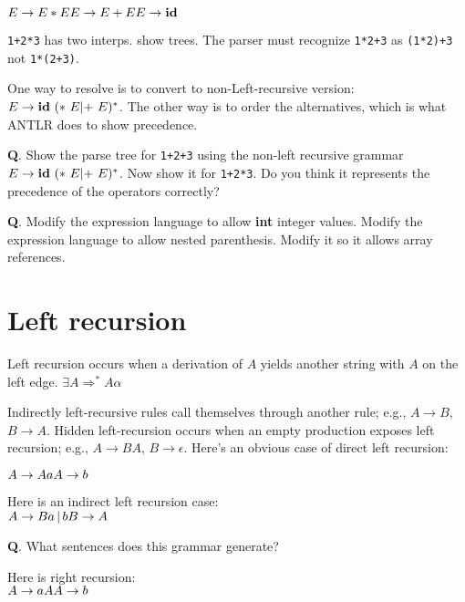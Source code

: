 \documentclass[11pt,twocolumn,nocopyright]{sigplanconf}
\begin{document}
\noindent $
E \rightarrow E * E\\
E \rightarrow E + E\\
E \rightarrow {\bf id}\\
$

{\tt 1+2*3} has two interps. show trees.  The parser must recognize {\tt 1*2+3} as {\tt (1*2)+3} not {\tt 1*(2+3)}.

One way to resolve is to convert to non-Left-recursive version: $E \rightarrow {\bf id}\ (*\ E | {\bf +}\ E)^*$.  The other way is to order the alternatives, which is what ANTLR does to show precedence.

{\bf Q}. Show the parse tree for {\tt 1+2+3} using the non-left recursive grammar $E \rightarrow {\bf id}\ (*\ E | {\bf +}\ E)^*$. Now show it for {\tt 1+2*3}. Do you think it represents the precedence of the operators correctly?

{\bf Q}. Modify the expression language to allow {\bf int} integer values. Modify the expression language to allow nested parenthesis. Modify it so it allows array references.

\section{Left recursion}

Left recursion occurs when a derivation of $A$ yields another string with $A$ on the left edge. $\exists A \Rightarrow^* A\alpha$
 
Indirectly left-recursive rules call themselves through another rule; e.g., $A \rightarrow B$, $B \rightarrow A$. Hidden left-recursion occurs
when an empty production exposes left recursion; e.g., $A \rightarrow
B A$, $B \rightarrow \epsilon$.  Here's an obvious case of direct left recursion:

\noindent $
A \rightarrow A a\\
A \rightarrow b\\
$

\noindent Here is an indirect left recursion case:\\

\noindent $
A \rightarrow Ba\, |\, b\\
B \rightarrow A\\
$

{\bf Q}. What sentences does this grammar generate?

\noindent Here is right recursion:\\

\noindent $
A \rightarrow a A\\
A \rightarrow b\\
$
\end{document}
